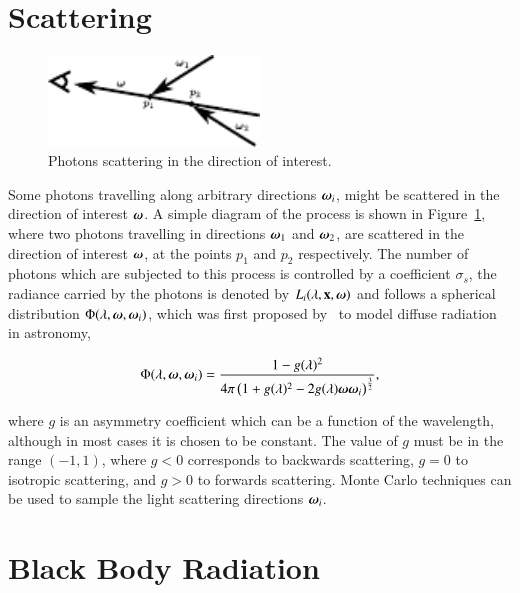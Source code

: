 \section{Scattering}
\label{sec:scattering}

\begin{figure}[htbp!]
	\centering
	\includegraphics[width=0.5\textwidth]{img/scattering_diag}
	\caption{Photons scattering in the direction of interest.}
	\label{fig:scattering_diag}
\end{figure}

Some photons travelling along arbitrary directions $\boldsymbol{\omega}_i$, might be scattered in the direction of interest $\boldsymbol{\omega}$.
A simple diagram of the process is shown in Figure~\ref{fig:scattering_diag}, where two photons travelling in directions $\boldsymbol{\omega}_1$ and $\boldsymbol{\omega}_2$, are scattered in the direction of interest $\boldsymbol{\omega}$, at the points $p_1$ and $p_2$ respectively.
The number of photons which are subjected to this process is controlled by a coefficient $\sigma_s$, the radiance carried by the photons is denoted by $L_i(\lambda, \mathbf{x}, \boldsymbol{\omega})$ and follows a spherical distribution $\Phi (\lambda, \boldsymbol{\omega}, \boldsymbol{\omega}_i)$, which was first proposed by~\cite{Henyey:1941} to model diffuse radiation in astronomy,

\begin{equation}
\Phi (\lambda, \boldsymbol{\omega}, \boldsymbol{\omega}_i) = \frac{1 - g(\lambda)^2}{4 \pi\left(1 + g(\lambda)^2 - 2 g(\lambda) \boldsymbol{\omega} \boldsymbol{\omega}_i\right)^{\frac{3}{2}}},
\end{equation}

where $g$ is an asymmetry coefficient which can be a function of the wavelength, although in most cases it is chosen to be constant.
The value of $g$ must be in the range $(-1, 1)$, where $g < 0$ corresponds to backwards scattering, $g = 0$ to isotropic scattering, and $g > 0$ to forwards scattering.
Monte Carlo techniques can be used to sample the light scattering directions $\boldsymbol{\omega}_i$.

\section{Black Body Radiation}
\label{sec:black_body_radiation}

